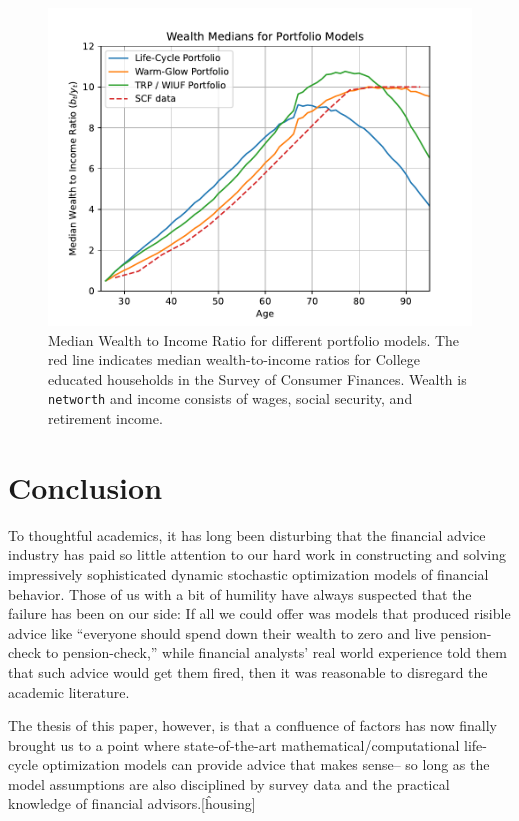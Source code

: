 \documentclass{article}
\begin{document}
\begin{figure}[!htbp]
\centering
\includegraphics[width=0.7\linewidth]{files/median_wealth-9642ec8cf12f2cc1fb7301752a15257b.pdf}
\caption[]{Median Wealth to Income Ratio for different portfolio models. The red line indicates median wealth-to-income ratios for College educated households in the Survey of Consumer Finances. Wealth is \texttt{networth} and income consists of wages, social security, and retirement income.}
\label{medwealth}
\end{figure}

\section{Conclusion}

To thoughtful academics, it has long been disturbing that the financial advice industry has paid so little attention to our hard work in constructing and solving impressively sophisticated dynamic stochastic optimization models of financial behavior.
Those of us with a bit of humility have always suspected that the failure has been on our side: If all we could offer was models that produced risible advice like ``everyone should spend down their wealth to zero and live pension-check to pension-check,'' while financial analysts' real world experience told them that such advice would get them fired, then it was reasonable to disregard the academic literature.

The thesis of this paper, however, is that a confluence of factors has now finally brought us to a point where state-of-the-art mathematical/computational life-cycle optimization models can provide advice that makes sense-- so long as the model assumptions are also disciplined by survey data and the practical knowledge of financial advisors.[\^housing]
\end{document}

